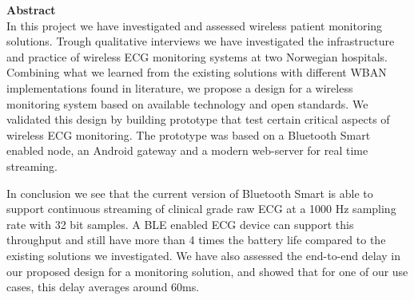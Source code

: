 \noindent \textbf{Abstract}
\\
\newline	
\noindent
In this project we have investigated and assessed wireless patient monitoring solutions. Trough qualitative interviews we have investigated the infrastructure and practice of wireless ECG monitoring systems at two Norwegian hospitals. Combining what we learned from the existing solutions with different WBAN implementations found in literature, we propose a design for a wireless monitoring system based on available technology and open standards. We validated this design by building prototype that test certain critical aspects of wireless ECG monitoring. The prototype was based on a Bluetooth Smart enabled node, an Android gateway and a modern web-server for real time streaming.

In conclusion we see that the current version of Bluetooth Smart is able to support continuous streaming of clinical grade raw ECG at a 1000 Hz sampling rate with 32 bit samples. A BLE enabled ECG device can support this throughput and still have more than 4 times the battery life compared to the existing solutions we investigated. We have also assessed the end-to-end delay in our proposed design for a monitoring solution, and showed that for one of our use cases, this delay averages around 60ms.